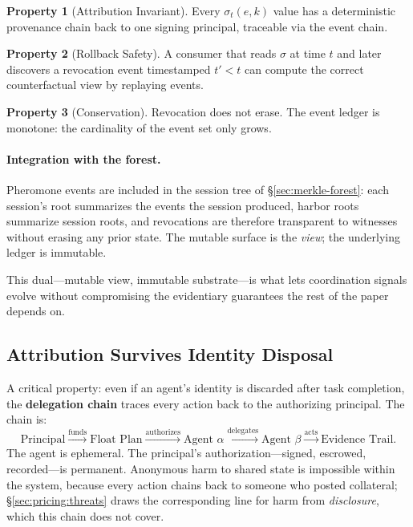 \documentclass[11pt,a4paper]{article}
\theoremstyle{definition}
\newtheorem{property}{Property}[section]
\theoremstyle{remark}
\begin{document}
\begin{property}[Attribution Invariant]\label{prop:pheromone-attribution}
Every $\sigma_t(e,k)$ value has a deterministic provenance chain back to one signing principal, traceable via the event chain.
\end{property}

\begin{property}[Rollback Safety]\label{prop:pheromone-rollback}
A consumer that reads $\sigma$ at time $t$ and later discovers a revocation event timestamped $t' < t$ can compute the correct counterfactual view by replaying events.
\end{property}

\begin{property}[Conservation]\label{prop:pheromone-conservation}
Revocation does not erase. The event ledger is monotone: the cardinality of the event set only grows.
\end{property}

\paragraph{Integration with the forest.} Pheromone events are included in the session tree of \S\ref{sec:merkle-forest}: each session's root summarizes the events the session produced, harbor roots summarize session roots, and revocations are therefore transparent to witnesses without erasing any prior state. The mutable surface is the \emph{view}; the underlying ledger is immutable.

This dual---mutable view, immutable substrate---is what lets coordination signals evolve without compromising the evidentiary guarantees the rest of the paper depends on.

\subsection{Attribution Survives Identity Disposal}\label{sec:attribution-survives}

A critical property: even if an agent's identity is discarded after task completion, the \textbf{delegation chain} traces every action back to the authorizing principal. The chain is:
\[
\text{Principal} \xrightarrow{\text{funds}} \text{Float Plan} \xrightarrow{\text{authorizes}} \text{Agent } \alpha \xrightarrow{\text{delegates}} \text{Agent } \beta \xrightarrow{\text{acts}} \text{Evidence Trail}.
\]
The agent is ephemeral. The principal's authorization---signed, escrowed, recorded---is permanent. Anonymous harm to shared state is impossible within the system, because every action chains back to someone who posted collateral; \S\ref{sec:pricing:threats} draws the corresponding line for harm from \emph{disclosure}, which this chain does not cover.
\end{document}
